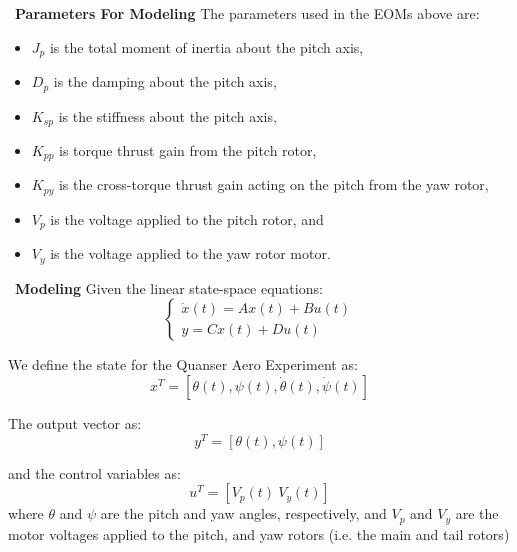 \documentclass[blue,mathserif,envcountsect,compress,10pt,xcolor=pdftex,dvipsnames,table]{beamer}
\begin{document}
\begin{frame}{\SquareShadowTopLeft~\bf Parameters For Modeling}
The parameters used in the EOMs above are:

\begin{itemize}
  \item $J_{p} $ is the total moment of inertia about the pitch axis,
  \item $D_{p} $ is the damping about the pitch axis,
  \item $K_{sp} $ is the stiffness about the pitch axis,
  \item $K_{pp} $ is torque thrust gain from the pitch rotor,
  \item $K_{py} $ is the cross-torque thrust gain acting on the pitch from the yaw rotor,
  \item $V_{p} $ is the voltage applied to the pitch rotor, and
  \item $V_{y} $ is the voltage applied to the yaw rotor motor.
\end{itemize}
\end{frame}

\begin{frame}{\SquareShadowTopLeft~\bf Modeling}
Given the linear state-space equations:
\begin{equation}\label{state-space}
    \left\{\begin{matrix}
    \dot{x}(t) = Ax(t)+Bu(t) \\
    y = Cx(t)+Du(t)
    \end{matrix}
    \right.
\end{equation}

We define the state for the Quanser Aero Experiment as:
$$
x^{T} = [\theta(t), \psi(t), \dot{\theta}(t), \dot{\psi}(t)]
$$

The output vector as:
$$
y^{T} = [\theta(t), \psi(t)]
$$

and the control variables as:
$$
u^{T} = [V_{p}(t)~V_{y}(t)]
$$
where $\theta$ and $\psi$ are the pitch and yaw angles, respectively, and $V_{p}$ and $V_{y}$ are the motor voltages applied to the pitch, and yaw rotors (i.e. the main and tail rotors)

\end{frame}
\end{document}

